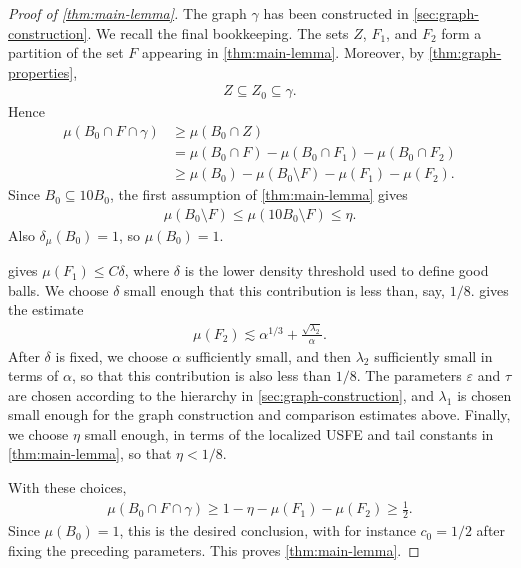 \documentclass[11pt,a4paper,english,reqno]{amsart}
\numberwithin{equation}{section}
\renewcommand{\subset}{\subseteq}
\numberwithin{definition}{section}
\begin{document}
\begin{proof}[Proof of \cref{thm:main-lemma}]
  The graph $\gamma$ has been constructed in \cref{sec:graph-construction}.  We recall the final bookkeeping.  The sets $Z$, $F_1$, and $F_2$ form a partition of the set $F$ appearing in \cref{thm:main-lemma}.  Moreover, by \cref{thm:graph-properties},
  \begin{align}
    Z\subset Z_0\subset \gamma .
  \end{align}
  Hence
  \begin{align}
    \mu(B_0\cap F\cap \gamma)
      &\ge \mu(B_0\cap Z) \\
      &= \mu(B_0\cap F)-\mu(B_0\cap F_1)-\mu(B_0\cap F_2) \\
      &\ge \mu(B_0)-\mu(B_0\setminus F)-\mu(F_1)-\mu(F_2).
  \end{align}
  Since $B_0\subset 10B_0$, the first assumption of \cref{thm:main-lemma} gives
  \begin{align}
    \mu(B_0\setminus F)\le \mu(10B_0\setminus F)\le \eta .
  \end{align}
  Also $\delta_\mu(B_0)=1$, so $\mu(B_0)=1$.

   gives $\mu(F_1)\le C\delta$, where $\delta$ is the lower density threshold used to define good balls.
  We choose $\delta$ small enough that this contribution is less than, say, $1/8$.
   gives the estimate
  \begin{align}
    \mu(F_2)\lesssim \alpha^{1/3}+\frac{\sqrt{\lambda_2}}{\alpha}.
  \end{align}
  After $\delta$ is fixed, we choose $\alpha$ sufficiently small, and then $\lambda_2$ sufficiently small in terms of $\alpha$, so that this contribution is also less than $1/8$.  The parameters $\varepsilon$ and $\tau$ are chosen according to the hierarchy in \cref{sec:graph-construction}, and $\lambda_1$ is chosen small enough for the graph construction and comparison estimates above.  Finally, we choose $\eta$ small enough, in terms of the localized USFE and tail constants in \cref{thm:main-lemma}, so that $\eta<1/8$.

  With these choices,
  \begin{align}
    \mu(B_0\cap F\cap \gamma)
      \ge 1-\eta-\mu(F_1)-\mu(F_2)
      \ge \frac12 .
  \end{align}
  Since $\mu(B_0)=1$, this is the desired conclusion, with for instance $c_0=1/2$ after fixing the preceding parameters.  This proves \cref{thm:main-lemma}.
\end{proof}
\end{document}
